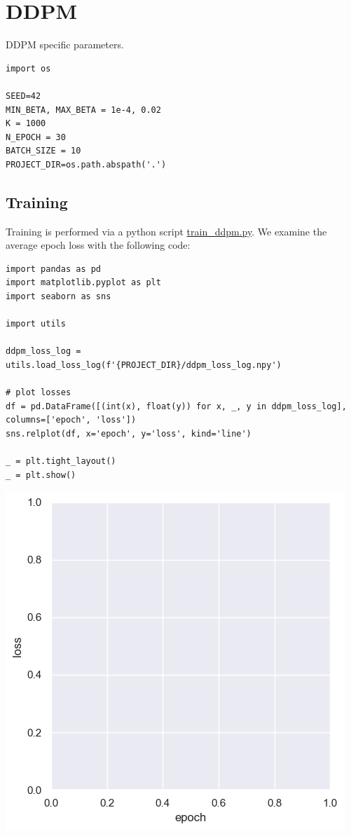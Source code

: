 \documentclass[a4paper, 11pt]{article}
\begin{document}
\section{DDPM}
\label{sec:org9478e81}
DDPM specific parameters.
\begin{verbatim}
import os

SEED=42
MIN_BETA, MAX_BETA = 1e-4, 0.02
K = 1000
N_EPOCH = 30
BATCH_SIZE = 10
PROJECT_DIR=os.path.abspath('.')
\end{verbatim}

\subsection{Training}
\label{sec:orge3623b2}
Training is performed via a python script \url{train\_ddpm.py}. We examine the average epoch loss with the following code:
\begin{verbatim}
import pandas as pd
import matplotlib.pyplot as plt
import seaborn as sns

import utils

ddpm_loss_log = utils.load_loss_log(f'{PROJECT_DIR}/ddpm_loss_log.npy')

# plot losses
df = pd.DataFrame([(int(x), float(y)) for x, _, y in ddpm_loss_log], columns=['epoch', 'loss'])
sns.relplot(df, x='epoch', y='loss', kind='line')

_ = plt.tight_layout()
_ = plt.show()
\end{verbatim}

\begin{center}
\includegraphics[width=.9\linewidth]{./.ob-jupyter/5e1419e04ffa8611806495b89d9dcbfafe0c4049.png}
\end{center}
\end{document}
